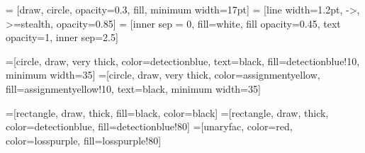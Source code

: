 \usepackage{tikz}
\usetikzlibrary{arrows}
\usetikzlibrary{snakes}
\usetikzlibrary{backgrounds}
\usetikzlibrary{patterns}
\usetikzlibrary{matrix}
\usetikzlibrary{shapes}
\usetikzlibrary{fit}
\usetikzlibrary{calc}
\usetikzlibrary{shadows}
\usetikzlibrary{plotmarks}
\usetikzlibrary{positioning}
\usetikzlibrary{fadings}
\usetikzlibrary{shapes.arrows}

 = [draw, circle, opacity=0.3, fill, minimum width=17pt]
 = [line width=1.2pt, ->, >=stealth, opacity=0.85]
 = [inner sep = 0, fill=white, fill opacity=0.45, text opacity=1, inner sep=2.5]






=[circle, draw, very thick, color=detectionblue, text=black,
fill=detectionblue!10, minimum width=35]
=[circle, draw, very thick, color=assignmentyellow, fill=assignmentyellow!10,
text=black, minimum width=35]

=[rectangle, draw, thick, fill=black, color=black]
=[rectangle, draw, thick, color=detectionblue, fill=detectionblue!80]
=[unaryfac, color=red, color=losspurple, fill=losspurple!80] 



